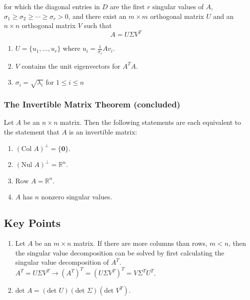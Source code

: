 \documentclass{article}
\begin{document}
for which the diagonal entries in $D$ are the first $r$ singular values of $A$,
$\sigma_1 \geq \sigma_2 \geq \cdots \geq \sigma_r > 0$, and there exist an $m\times m$ orthogonal
matrix $U$ and an $n\times n$ orthogonal matrix $V$ such that
\[A=U\Sigma V^T\]
\begin{enumerate}
    \item $U=\{u_1, \ldots, u_r\}$ where $u_i=\frac{1}{\sigma_i}Av_i$.
    \item $V$ contains the unit eigenvectors for $A^T A$.
    \item $\sigma_i = \sqrt{\lambda_i}$ for $1\leq i \leq n$
\end{enumerate}

\subsubsection*{The Invertible Matrix Theorem (concluded)}
Let $A$ be an $n\times n$ matrix. Then the following statements are each equivalent to the
statement that $A$ is an invertible matrix:

\begin{enumerate}
    \item ${(\text{Col }A)}^\perp = \{\mathbf{0}\}$.
    \item ${(\text{Nul }A)}^\perp = \mathbb{R}^n$.
    \item $\text{Row }A=\mathbb{R}^n$.
    \item $A$ has $n$ nonzero singular values.
\end{enumerate}

\subsection*{Key Points}
\begin{enumerate}
    \item Let $A$ be an $m\times n$ matrix. If there are more columns than rows, $m<n$, then the
    singular value decomposition can be solved by first calculating the singular value
    decomposition of $A^T$. $A^T=U\Sigma V^T\rightarrow {(A^T)}^T={(U\Sigma V^T)}^T=V\Sigma^T U^T$.
    \item $\text{det }A=(\text{det }U)(\text{det }\Sigma)(\text{det }V^T)$.
\end{enumerate}
\end{document}
